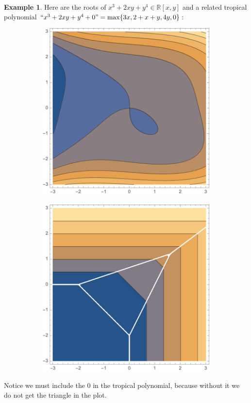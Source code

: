 \documentclass{article}
\theoremstyle{definition}
\newtheorem{ex}{Example}
\newcommand{\R}{\mathbb{R}}
\begin{document}
\begin{ex}
	Here are the roots of $x^3 + 2 xy + y^4\in\R[x,y]$ and a related tropical polynomial $``x^3 + 2 xy + y^4+0"=\max\{3 x, 2 + x + y, 4 y,0\}$:
	\begin{figure}[H]
		\begin{subfigure}{.5\textwidth}
			\centering
			\includegraphics[width=0.9\linewidth]{dani5}
		\end{subfigure}
		\begin{subfigure}{.5\textwidth}
			\centering
			\includegraphics[width=0.9\linewidth]{dani6}
		\end{subfigure}
	\end{figure}
	Notice we must include the 0 in the tropical polynomial, because without it we do not get the triangle in the plot.
\end{ex}
\end{document}
